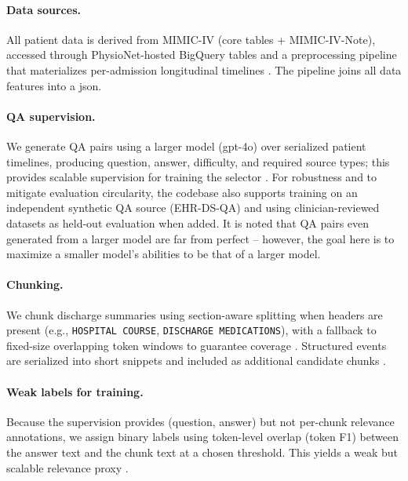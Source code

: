 \paragraph{Data sources.}
All patient data is derived from MIMIC-IV (core tables + MIMIC-IV-Note), accessed through PhysioNet-hosted BigQuery tables and a preprocessing pipeline that materializes per-admission longitudinal timelines . The pipeline joins all data features into a json.

\paragraph{QA supervision.}
We generate QA pairs using a larger model (gpt-4o) over serialized patient timelines, producing question, answer, difficulty, and required source types; this provides scalable supervision for training the selector . For robustness and to mitigate evaluation circularity, the codebase also supports training on an independent synthetic QA source (EHR-DS-QA) and using clinician-reviewed datasets as held-out evaluation when added. It is noted that QA pairs even generated from a larger model are far from perfect -- however, the goal here is to maximize a smaller model's abilities to be that of a larger model.

\paragraph{Chunking.}
We chunk discharge summaries using section-aware splitting when headers are present (e.g., \texttt{HOSPITAL COURSE}, \texttt{DISCHARGE MEDICATIONS}), with a fallback to fixed-size overlapping token windows to guarantee coverage . Structured events are serialized into short snippets and included as additional candidate chunks .

\paragraph{Weak labels for training.}
Because the supervision provides (question, answer) but not per-chunk relevance annotations, we assign binary labels using token-level overlap (token F1) between the answer text and the chunk text at a chosen threshold. This yields a weak but scalable relevance proxy .

